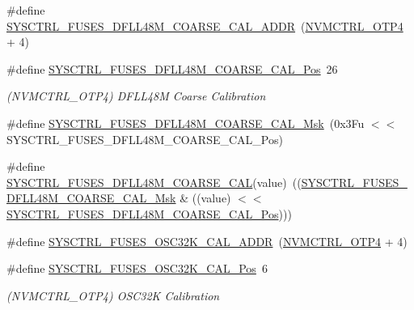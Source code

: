 \begin{DoxyCompactItemize}
\item 
\#define \mbox{\hyperlink{group__fuses__api_ga02c6ae2cdaea5e6afa670f7f41a60b28}{S\+Y\+S\+C\+T\+R\+L\+\_\+\+F\+U\+S\+E\+S\+\_\+\+D\+F\+L\+L48\+M\+\_\+\+C\+O\+A\+R\+S\+E\+\_\+\+C\+A\+L\+\_\+\+A\+D\+DR}}~(\mbox{\hyperlink{group___s_a_m_d21_j18_a__base_ga138b4aca5a0446a745fe143c1dca8165}{N\+V\+M\+C\+T\+R\+L\+\_\+\+O\+T\+P4}} + 4)
\item 
\#define \mbox{\hyperlink{group__fuses__api_ga51f5672c36fc4ecc525645fffc0c01d9}{S\+Y\+S\+C\+T\+R\+L\+\_\+\+F\+U\+S\+E\+S\+\_\+\+D\+F\+L\+L48\+M\+\_\+\+C\+O\+A\+R\+S\+E\+\_\+\+C\+A\+L\+\_\+\+Pos}}~26
\begin{DoxyCompactList}\small\item\em (N\+V\+M\+C\+T\+R\+L\+\_\+\+O\+T\+P4) D\+F\+L\+L48M Coarse Calibration \end{DoxyCompactList}\item 
\#define \mbox{\hyperlink{group__fuses__api_gabf2803a33a11cc8a876e18c3df480e81}{S\+Y\+S\+C\+T\+R\+L\+\_\+\+F\+U\+S\+E\+S\+\_\+\+D\+F\+L\+L48\+M\+\_\+\+C\+O\+A\+R\+S\+E\+\_\+\+C\+A\+L\+\_\+\+Msk}}~(0x3\+Fu $<$$<$ S\+Y\+S\+C\+T\+R\+L\+\_\+\+F\+U\+S\+E\+S\+\_\+\+D\+F\+L\+L48\+M\+\_\+\+C\+O\+A\+R\+S\+E\+\_\+\+C\+A\+L\+\_\+\+Pos)
\item 
\#define \mbox{\hyperlink{group__fuses__api_ga14bd7786e2f90dc0fca0a703590b1436}{S\+Y\+S\+C\+T\+R\+L\+\_\+\+F\+U\+S\+E\+S\+\_\+\+D\+F\+L\+L48\+M\+\_\+\+C\+O\+A\+R\+S\+E\+\_\+\+C\+AL}}(value)~((\mbox{\hyperlink{group__fuses__api_gabf2803a33a11cc8a876e18c3df480e81}{S\+Y\+S\+C\+T\+R\+L\+\_\+\+F\+U\+S\+E\+S\+\_\+\+D\+F\+L\+L48\+M\+\_\+\+C\+O\+A\+R\+S\+E\+\_\+\+C\+A\+L\+\_\+\+Msk}} \& ((value) $<$$<$ \mbox{\hyperlink{group__fuses__api_ga51f5672c36fc4ecc525645fffc0c01d9}{S\+Y\+S\+C\+T\+R\+L\+\_\+\+F\+U\+S\+E\+S\+\_\+\+D\+F\+L\+L48\+M\+\_\+\+C\+O\+A\+R\+S\+E\+\_\+\+C\+A\+L\+\_\+\+Pos}})))
\item 
\#define \mbox{\hyperlink{group__fuses__api_gac9ee33c95861a26a77b87ecd024a163f}{S\+Y\+S\+C\+T\+R\+L\+\_\+\+F\+U\+S\+E\+S\+\_\+\+O\+S\+C32\+K\+\_\+\+C\+A\+L\+\_\+\+A\+D\+DR}}~(\mbox{\hyperlink{group___s_a_m_d21_j18_a__base_ga138b4aca5a0446a745fe143c1dca8165}{N\+V\+M\+C\+T\+R\+L\+\_\+\+O\+T\+P4}} + 4)
\item 
\#define \mbox{\hyperlink{group__fuses__api_gae742aeae0713fcc6db6fd3b9036250a9}{S\+Y\+S\+C\+T\+R\+L\+\_\+\+F\+U\+S\+E\+S\+\_\+\+O\+S\+C32\+K\+\_\+\+C\+A\+L\+\_\+\+Pos}}~6
\begin{DoxyCompactList}\small\item\em (N\+V\+M\+C\+T\+R\+L\+\_\+\+O\+T\+P4) O\+S\+C32K Calibration \end{DoxyCompactList}\item 

\end{DoxyCompactItemize}
